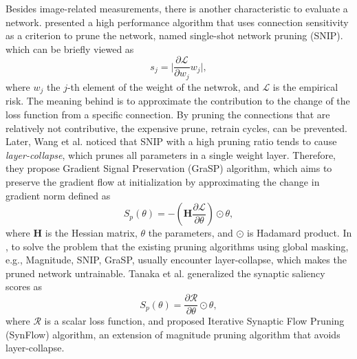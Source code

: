 \documentclass[sigconf]{acmart}
\begin{document}
    Besides image-related measurements, there is another characteristic to evaluate a network. 
    \cite{lee2019snip} presented a high performance algorithm that uses connection 
    sensitivity as a criterion to prune the network, named single-shot network pruning (SNIP). 
    which can be briefly viewed as 
    \begin{equation}
        \label{equ:snip_connection_sensitivity}
        s_j=\lvert \frac{\partial \mathcal L}{\partial w_j}w_j\rvert,
    \end{equation}
    where $w_j$ the $j$-th element of the weight of the netwrok, and $\mathcal L$ is 
    the empirical risk. The meaning behind is to approximate the contribution 
    to the change of the loss function from a specific connection. By pruning the 
    connections that are relatively not contributive, the expensive prune, retrain 
    cycles, can be prevented. 
    Later, Wang et al. \cite{wang2020picking} noticed that SNIP with a high pruning ratio 
    tends to cause \textit{layer-collapse}, which prunes all parameters in a single weight 
    layer. Therefore, they propose Gradient Signal Preservation (GraSP) algorithm, which 
    aims to preserve the gradient flow at initialization by approximating the change in 
    gradient norm defined as 
    \begin{equation}
        \label{equ:grap}
        S_p(\theta)=-(\textbf{H}\frac{\partial \mathcal L}{\partial \theta})\odot\theta,
    \end{equation}
    where $\textbf{H}$ is the Hessian matrix, $\theta$ the parameters, and $\odot$ is Hadamard product. 
    In \cite{tanaka2020pruning}, to solve the problem that the existing pruning algorithms using 
    global masking, e.g., Magnitude, SNIP, GraSP, usually encounter layer-collapse, which makes 
    the pruned network untrainable. 
    Tanaka et al. generalized the synaptic saliency scores as 
    \begin{equation}
        \label{equ:synflow}
        S_p(\theta)=\frac{\partial \mathcal R}{\partial \theta}\odot\theta,
    \end{equation}
    where $\mathcal R$ is a scalar loss function, and proposed Iterative Synaptic Flow Pruning (SynFlow) 
    algorithm, an extension of magnitude pruning algorithm that avoids layer-collapse. 
\end{document}
